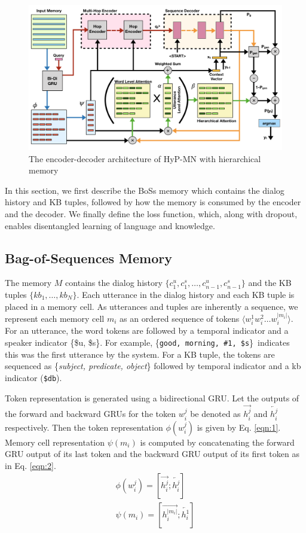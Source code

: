 \begin{figure}[ht]
\centering
\includegraphics[scale=0.4]{assets/paper_arch.png}
\caption{The encoder-decoder architecture of HyP-MN with hierarchical memory}
\label{fig:system}
\end{figure}

In this section, we first describe the {\sc BoSs} memory which contains the dialog history and KB tuples, followed by how the memory is consumed by the encoder and the decoder. We finally define the loss function, which, along with dropout, enables disentangled learning of language and knowledge.

\subsection{Bag-of-Sequences Memory} 
\label{sec:hmemory}
The memory $M$ contains the dialog history $\{c_1^u, c_1^s, \ldots, c_{n-1}^u, c_{n-1}^s\}$ and the KB tuples $\{kb_1, \ldots, kb_{N}\}$.  Each utterance in the dialog history and each KB tuple is placed in a memory cell. As utterances and tuples are inherently a sequence, we represent each  memory cell  $m_i$ as an ordered sequence of tokens $\langle w^1_i w^2_i \ldots w^{|m_i|}_i\rangle$. For an utterance, the word tokens are followed by a temporal indicator and a speaker indicator \{\$u, \$s\}. For example, \{\texttt{good, morning, \#1, \$s}\}\ indicates this was the first utterance by the system. For a KB tuple, the tokens are sequenced as \{\textit{subject, predicate, object}\} followed by temporal indicator and a kb indicator (\texttt{\$db}).

Token representation is generated using a bidirectional GRU. Let the outputs of the forward and backward GRUs for the token $w^j_i$ be denoted as $\overrightarrow{h^j_{i}}$ and $\overleftarrow{h^j_{i}}$ respectively. Then the token representation $\phi(w^j_i)$ is given by Eq. \ref{eqn:1}. Memory cell representation $\psi(m_i)$ is computed by concatenating the forward GRU output of its last token and the backward GRU output of its first token as in Eq. \ref{eqn:2}. 
\begin{eqnarray}
\phi(w^j_i)=[\overrightarrow{h^j_{i}};\overleftarrow{h_{i}^j}] \label{eqn:1} \\
\psi(m_i)=[\overrightarrow{h_{i}^{|m_i|}};\overleftarrow{h_{i}^1}] \label{eqn:2}
\end{eqnarray}

